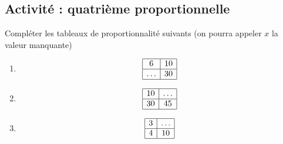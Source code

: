 
\subsection*{Activité : quatrième proportionnelle}

Compléter les tableaux de proportionnalité suivants (on pourra appeler \( x\) la valeur manquante)
\begin{multicols}{3}
    \begin{enumerate}
        \item
            \begin{equation*}
                \begin{array}[]{|c|c|}
                    \hline
                    6&10\\
                    \hline
                    \ldots&30\\
                    \hline
                \end{array}
            \end{equation*}
        \item
            \begin{equation*}
                \begin{array}[]{|c|c|}
                    \hline
                    10&\ldots\\
                    \hline
                    30&45\\
                    \hline
                \end{array}
            \end{equation*}
        \item
            \begin{equation*}
                \begin{array}[]{|c|c|}
                    \hline
                    3&\ldots\\
                    \hline
                    4&10\\
                    \hline
                \end{array}
            \end{equation*}
    \end{enumerate}
\end{multicols}


